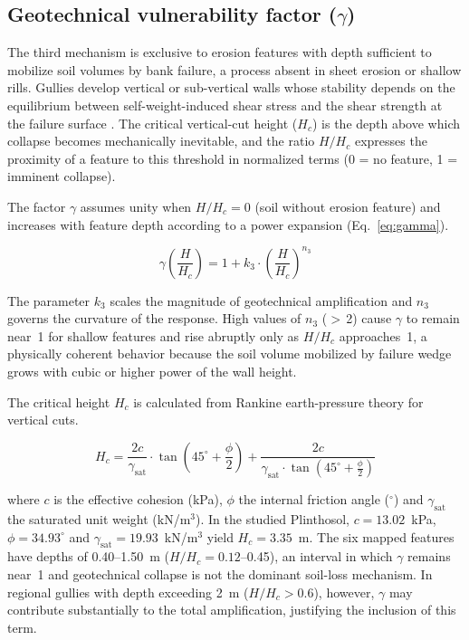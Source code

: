 \documentclass[preprint,review,12pt,authoryear]{elsarticle}
\begin{document}
\subsection{Geotechnical vulnerability factor ($\gamma$)}

The third mechanism is exclusive to erosion features with depth sufficient to mobilize soil volumes by bank failure, a process absent in sheet erosion or shallow rills. Gullies develop vertical or sub-vertical walls whose stability depends on the equilibrium between self-weight-induced shear stress and the shear strength at the failure surface \citep{fredlund_rahardjo_1993}. The critical vertical-cut height ($H_c$) is the depth above which collapse becomes mechanically inevitable, and the ratio $H/H_c$ expresses the proximity of a feature to this threshold in normalized terms (0 = no feature, 1 = imminent collapse).

The factor $\gamma$ assumes unity when $H/H_c = 0$ (soil without erosion feature) and increases with feature depth according to a power expansion (Eq.~\ref{eq:gamma}).

\begin{equation}
\gamma\!\left(\frac{H}{H_c}\right) = 1 + k_3 \cdot \left(\frac{H}{H_c}\right)^{n_3}
\label{eq:gamma}
\end{equation}

The parameter $k_3$ scales the magnitude of geotechnical amplification and $n_3$ governs the curvature of the response. High values of $n_3$ ($>$\,2) cause $\gamma$ to remain near~1 for shallow features and rise abruptly only as $H/H_c$ approaches~1, a physically coherent behavior because the soil volume mobilized by failure wedge grows with cubic or higher power of the wall height.

The critical height $H_c$ is calculated from Rankine earth-pressure theory for vertical cuts.

\begin{equation}
H_c = \frac{2c}{\gamma_{\mathrm{sat}}} \cdot \tan\!\left(45^\circ + \frac{\phi}{2}\right) + \frac{2c}{\gamma_{\mathrm{sat}} \cdot \tan\!\left(45^\circ + \frac{\phi}{2}\right)}
\label{eq:hc}
\end{equation}

\noindent where $c$ is the effective cohesion (kPa), $\phi$ the internal friction angle ($^\circ$) and $\gamma_{\mathrm{sat}}$ the saturated unit weight (kN/m$^3$). In the studied Plinthosol, $c = 13.02$~kPa, $\phi = 34.93^\circ$ and $\gamma_{\mathrm{sat}} = 19.93$~kN/m$^3$ yield $H_c = 3.35$~m. The six mapped features have depths of 0.40--1.50~m ($H/H_c = 0.12$--0.45), an interval in which $\gamma$ remains near~1 and geotechnical collapse is not the dominant soil-loss mechanism. In regional gullies with depth exceeding 2~m ($H/H_c > 0.6$), however, $\gamma$ may contribute substantially to the total amplification, justifying the inclusion of this term.
\end{document}
